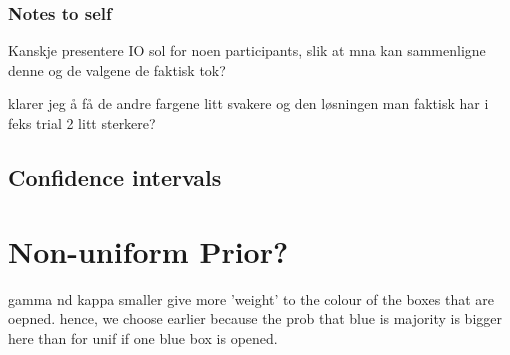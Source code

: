 \subsubsection{Notes to self}
Kanskje presentere IO sol for noen participants, slik at mna kan sammenligne denne og de valgene de faktisk tok?

klarer jeg å få de andre fargene litt svakere og den løsningen man faktisk har i feks trial 2 litt sterkere?


\subsection{Confidence intervals}


\section{Non-uniform Prior?}
gamma nd kappa smaller give more 'weight' to the colour of the boxes that are oepned. hence, we choose earlier because the prob that blue is majority is bigger here than for unif if one blue box is opened. 